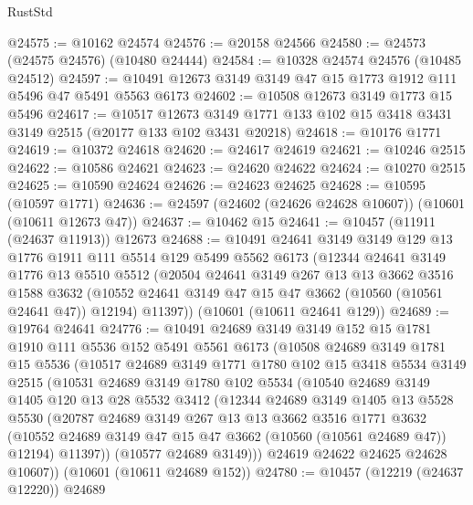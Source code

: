 \begin{lexlean}{RustStd}
\begin{coremodule}
@24575 := @10162 @24574
@24576 := @20158 @24566
@24580 := @24573 (@24575 @24576) (@10480 @24444)
@24584 := @10328 @24574 @24576 (@10485 @24512)
@24597 := @10491 @12673 @3149 @3149 @47 @15 @1773 @1912 @111 @5496 @47 @5491 @5563 @6173
@24602 := @10508 @12673 @3149 @1773 @15 @5496
@24617 := @10517
    @12673
    @3149
    @1771
    @133
    @102
    @15
    @3418
    @3431
    @3149
    @2515
    (@20177 @133 @102 @3431 @20218)
@24618 := @10176 @1771
@24619 := @10372 @24618
@24620 := @24617 @24619
@24621 := @10246 @2515
@24622 := @10586 @24621
@24623 := @24620 @24622
@24624 := @10270 @2515
@24625 := @10590 @24624
@24626 := @24623 @24625
@24628 := @10595 (@10597 @1771)
@24636 := @24597 (@24602 (@24626 @24628 @10607)) (@10601 (@10611 @12673 @47))
@24637 := @10462 @15
@24641 := @10457 (@11911 (@24637 @11913)) @12673
@24688 := @10491
    @24641
    @3149
    @3149
    @129
    @13
    @1776
    @1911
    @111
    @5514
    @129
    @5499
    @5562
    @6173
    (@12344
      @24641
      @3149
      @1776
      @13
      @5510
      @5512
      (@20504
        @24641
        @3149
        @267
        @13
        @13
        @3662
        @3516
        @1588
        @3632
        (@10552 @24641 @3149 @47 @15 @47 @3662 (@10560 (@10561 @24641 @47)) @12194)
        @11397))
    (@10601 (@10611 @24641 @129))
@24689 := @19764 @24641
@24776 := @10491
    @24689
    @3149
    @3149
    @152
    @15
    @1781
    @1910
    @111
    @5536
    @152
    @5491
    @5561
    @6173
    (@10508
      @24689
      @3149
      @1781
      @15
      @5536
      (@10517
        @24689
        @3149
        @1771
        @1780
        @102
        @15
        @3418
        @5534
        @3149
        @2515
        (@10531
          @24689
          @3149
          @1780
          @102
          @5534
          (@10540
            @24689
            @3149
            @1405
            @120
            @13
            @28
            @5532
            @3412
            (@12344
              @24689
              @3149
              @1405
              @13
              @5528
              @5530
              (@20787
                @24689
                @3149
                @267
                @13
                @13
                @3662
                @3516
                @1771
                @3632
                (@10552 @24689 @3149 @47 @15 @47 @3662 (@10560 (@10561 @24689 @47)) @12194)
                @11397))
            (@10577 @24689 @3149)))
        @24619
        @24622
        @24625
        @24628
        @10607))
    (@10601 (@10611 @24689 @152))
@24780 := @10457 (@12219 (@24637 @12220)) @24689

\end{coremodule}
\end{lexlean}
